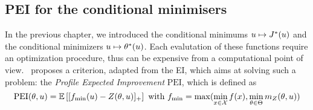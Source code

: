 \documentclass[../../Main_ManuscritThese.tex]{subfiles}
\begin{document}




\subsection{PEI for the conditional minimisers}
\label{sec:PEI_criterion}
In the previous chapter, we introduced the conditional minimums
$u\mapsto J^*(u)$ and the conditional minimizers
$u \mapsto \theta^*(u)$. Each evalutation of these functions require
an optimization procedure, thus can be expensive from a computational
point of view.~\cite{ginsbourger_bayesian_2014} proposes a criterion,
adapted from the EI, which aims at solving such a problem: the
\emph{Profile Expected Improvement} $\mathrm{PEI}$, which is defined
as
\begin{equation}
  \label{eq:def_PEI}
  \mathrm{PEI}(\theta, u)= \mathbb{E}\left[[f_{\min}(u) - Z(\theta, u)]_+\right] \text{ with } f_{\min} = \max(\min_{x\in\mathcal{X}} f(x), \min_{\theta \in \Theta} m_Z(\theta, u))
\end{equation}
\end{document}
